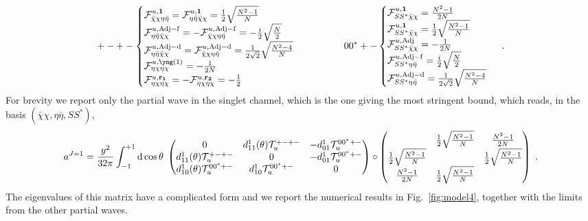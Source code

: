 \documentclass[a4paper,11pt]{article}
\newcommand{\be}{\begin{equation}}
\newcommand{\ee}{\end{equation}}
\begin{document}
\begin{align}\label{eq:group_model3_J1}
+-+-
\begin{cases}
{\cal F}^{u,{\bf 1}}_{\bar \chi \chi \eta \bar \eta} = {\cal F}^{u,{\bf 1}}_{\eta \bar \eta \bar \chi \chi } =  \frac{1}{2}\sqrt{\frac{N^2-1}{N}}\\
%
{\cal F}^{u,{\rm Adj-f}}_{\eta\bar\eta \bar\chi\chi}=-{\cal F}^{u,{\rm Adj-f}}_{ \bar\chi\chi \eta\bar\eta}  = -\frac{i}{2}\sqrt{\frac{N}{2}} \\
%
{\cal F}^{u,{\rm Adj-d}}_{\eta\bar\eta \bar\chi\chi}={\cal F}^{u,{\rm Adj-d}}_{ \bar\chi\chi \eta\bar\eta}  =  \frac{1}{2\sqrt 2}\sqrt{\frac{N^2-4}{N} } \\
%
%
{\cal F}^{u,{\tiny{\yng(1)}}}_{\eta\chi\eta\chi} = -\frac{1}{2N}\\
%
%
{\cal F}^{u,{\bf r_1}}_{\eta\chi\eta\chi} = - {\cal F}^{u,{\bf r_2}}_{\eta\chi\eta\chi} = -\frac{1}{2} \\
\end{cases}
%
\qquad \qquad
00^*+-
\begin{cases} 
{\cal F}^{u,{\bf 1}}_{S S^*\bar \chi \chi } = \frac{N^2-1}{2N} \\
%
{\cal F}^{u,{\bf 1}}_{S S^*\bar \chi \chi } = \frac{1}{2}\sqrt{\frac{N^2-1}{N}} \\
%
{\cal F}^{u,{\rm Adj}}_{ S S^*\bar \chi \chi} = -\frac{1}{2N}\\
%
%
{\cal F}^{u,{\rm Adj-f}}_{S S^*\eta\bar \eta } = \frac{i}{2}\sqrt{\frac{N}{2}} \\
%
{\cal F}^{u,{\rm Adj-d}}_{S S^*\eta\bar \eta } = \frac{1}{2\sqrt 2}\sqrt{\frac{N^2-4}{N}}\\
\end{cases} \ .
\end{align}
For brevity we report only the partial wave in the singlet channel, which is the one giving the most stringent bound, which reads, in the basis $(\bar \chi \chi, \eta\bar \eta, S S^*)$,
\be\label{eq:model4_j1complex_sing}
a^{J=1}=\frac{y^2}{32\pi} \int_{-1}^{+1}{\rm d}\cos\theta \; 
\begin{pmatrix}
0 & d^{1}_{11}(\theta) {\cal T}_u^{+-+-}& -d^{1}_{01}{\cal T}_u^{00^*+-} \\
d^{1}_{11}(\theta) {\cal T}_u^{+-+-} & 0 &  -d^{1}_{01}{\cal T}_u^{00^*+-} \\
 d^{1}_{10}(\theta) {\cal T}_u^{00^*+-} &  d^{1}_{10} {\cal T}_u^{00^*+-} & 0
\end{pmatrix}
\circ
\begin{pmatrix}
 &  \frac{1}{2}\sqrt{\frac{N^2-1}{N}}  & \frac{N^2-1}{2N}\\
 \frac{1}{2}\sqrt{\frac{N^2-1}{N}}  &  &\frac{1}{2}\sqrt{\frac{N^2-1}{N}}\\
\frac{N^2-1}{2N}&\frac{1}{2}\sqrt{\frac{N^2-1}{N}} & 
\end{pmatrix}  
\ .
\ee
The eigenvalues of this matrix have a complicated form and we report the numerical results in Fig.~\ref{fig:model4}, together with the limits from the other partial waves.
\end{document}

